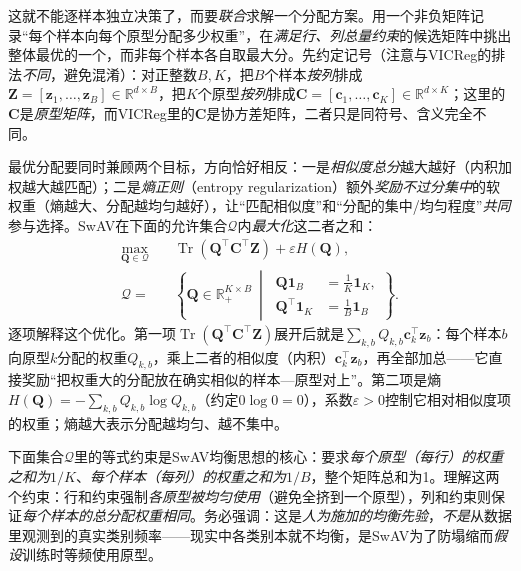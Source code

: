 这就不能逐样本独立决策了，而要\emph{联合}求解一个分配方案。用一个非负矩阵记录“每个样本向每个原型分配多少权重”，在\emph{满足行、列总量约束}的候选矩阵中挑出整体最优的一个，而非每个样本各自取最大分。先约定记号（注意与VICReg的排法\emph{不同}，避免混淆）：对正整数$B,K$，把$B$个样本\emph{按列}排成$\bm{Z}=[\bm{z}_1,\ldots,\bm{z}_B]\in\mathbb{R}^{d\times B}$，把$K$个原型\emph{按列}排成$\bm{C}=[\bm{c}_1,\ldots,\bm{c}_K]\in\mathbb{R}^{d\times K}$；这里的$\bm{C}$是\emph{原型矩阵}，而VICReg里的$\bm{C}$是协方差矩阵，二者只是同符号、含义完全不同。

最优分配要同时兼顾两个目标，方向恰好相反：一是\emph{相似度总分}越大越好（内积加权越大越匹配）；二是\emph{熵正则}（entropy regularization）额外\emph{奖励不过分集中}的软权重（熵越大、分配越均匀越好），让“匹配相似度”和“分配的集中/均匀程度”\emph{共同}参与选择。SwAV在下面的允许集合$\mathcal{Q}$内\emph{最大化}这二者之和：
\begin{align}
  \max_{\bm{Q}\in\mathcal{Q}}\quad&
  \operatorname{Tr}(\bm{Q}^{\top}\bm{C}^{\top}\bm{Z})
  +\varepsilon H(\bm{Q}),\\
  \mathcal{Q}
  ={}&
  \left\{
    \bm{Q}\in\mathbb{R}_{+}^{K\times B}
    \ \middle|\
    \begin{aligned}
      \bm{Q}\bm{1}_B&=\frac{1}{K}\bm{1}_K,\\
      \bm{Q}^{\top}\bm{1}_K&=\frac{1}{B}\bm{1}_B
    \end{aligned}
  \right\}.
  \label{eq:data-derived-knowledge-swav-assignment}
\end{align}
逐项解释这个优化。第一项$\operatorname{Tr}(\bm{Q}^{\top}\bm{C}^{\top}\bm{Z})$展开后就是$\sum_{k,b}Q_{k,b}\bm{c}_k^{\top}\bm{z}_b$：每个样本$b$向原型$k$分配的权重$Q_{k,b}$，乘上二者的相似度（内积）$\bm{c}_k^{\top}\bm{z}_b$，再全部加总——它直接奖励“把权重大的分配放在确实相似的样本—原型对上”。第二项是熵$H(\bm{Q})=-\sum_{k,b}Q_{k,b}\log Q_{k,b}$（约定$0\log0=0$），系数$\varepsilon>0$控制它相对相似度项的权重；熵越大表示分配越均匀、越不集中。

下面集合$\mathcal{Q}$里的等式约束是SwAV均衡思想的核心：要求\emph{每个原型（每行）的权重之和为}$1/K$、\emph{每个样本（每列）的权重之和为}$1/B$，整个矩阵总和为1。理解这两个约束：行和约束强制\emph{各原型被均匀使用}（避免全挤到一个原型），列和约束则保证\emph{每个样本的总分配权重相同}。务必强调：这是\emph{人为施加的均衡先验}，\emph{不是}从数据里观测到的真实类别频率——现实中各类别本就不均衡，是SwAV为了防塌缩而\emph{假设}训练时等频使用原型。

